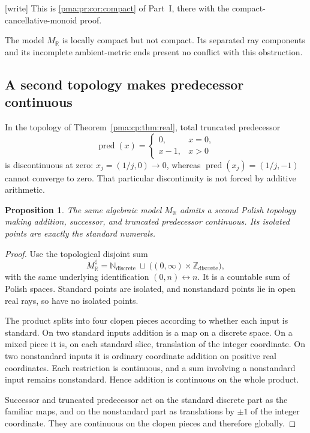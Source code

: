 \documentclass[11pt]{article}
\numberwithin{equation}{section}
\newtheorem{proposition}[proposition]{Proposition}
\theoremstyle{definition}
\theoremstyle{remark}
\newcommand{\N}{\mathbb N}
\newcommand{\Z}{\mathbb Z}
\newcommand{\R}{\mathbb R}
\newcommand{\writetag}{\textup{\textsf{\small[write]}}}
\begin{document}
\noindent\writetag{} This is \cref{pma:pr:cor:compact} of Part~I, there with
the compact-cancellative-monoid proof.

The model $M_{\R}$ is locally compact but not compact. Its separated
ray components and its incomplete ambient-metric ends present no conflict
with this obstruction.

\subsection{A second topology makes predecessor continuous}

In the topology of Theorem~\ref{pma:cp:thm:real}, total truncated predecessor
\[
\operatorname{pred}(x)=
\begin{cases}0,&x=0,\\x-1,&x>0\end{cases}
\]
is discontinuous at zero: $x_j=(1/j,0)\to0$, whereas
$\operatorname{pred}(x_j)=(1/j,-1)$ cannot converge to zero.
That particular discontinuity is not forced by additive arithmetic.

\begin{proposition}
\label{pma:cp:prop:isolatedstandard}
The same algebraic model $M_{\R}$ admits a second Polish topology making
addition, successor, and truncated predecessor continuous. Its isolated
points are exactly the standard numerals.
\end{proposition}

\begin{proof}
Use the topological disjoint sum
\[
M_{\R}^{\sharp}
=\N_{\mathrm{discrete}}\ \sqcup\
\bigl((0,\infty)\times\Z_{\mathrm{discrete}}\bigr),
\]
with the same underlying identification $(0,n)\leftrightarrow n$.
It is a countable sum of Polish spaces. Standard points are isolated,
and nonstandard points lie in open real rays, so have no isolated points.

The product splits into four clopen pieces according to whether each
input is standard. On two standard inputs addition is a map on a discrete
space. On a mixed piece it is, on each standard slice, translation of
the integer coordinate. On two nonstandard inputs it is ordinary
coordinate addition on positive real coordinates. Each restriction is
continuous, and a sum involving a nonstandard input remains nonstandard.
Hence addition is continuous on the whole product.

Successor and truncated predecessor act on the standard discrete part
as the familiar maps, and on the nonstandard part as translations by
$\pm1$ of the integer coordinate. They are continuous on the clopen
pieces and therefore globally.
\end{proof}
\end{document}
